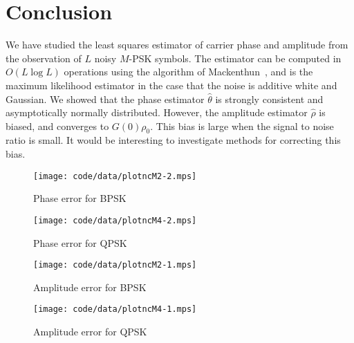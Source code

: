 \documentclass{article}
\begin{document}
\vspace{-0.1cm}
\section{Conclusion}
\vspace{-0.1cm}
We have studied the least squares estimator of carrier phase and amplitude from the observation of $L$ noisy $M$-PSK symbols.  The estimator can be computed in $O(L\log L)$ operations using the algorithm of Mackenthun~\cite{Mackenthun1994}, and is the maximum likelihood estimator in the case that the noise is additive white and Gaussian.  We showed that the phase estimator $\hat{\theta}$ is strongly consistent and asymptotically normally distributed.  However, the amplitude estimator $\hat{\rho}$ is biased, and converges to $G(0)\rho_0$.  This bias is large when the signal to noise ratio is small.  It would be interesting to investigate methods for correcting this bias. 


\begin{figure}[p]
	\centering
		\texttt{[image: code/data/plotncM2-2.mps]}
		\caption{Phase error for BPSK}
		\label{fig:plotphaseM2}
\end{figure}

\begin{figure}[p]
	\centering
		\texttt{[image: code/data/plotncM4-2.mps]}
		\caption{Phase error for QPSK}
		\label{fig:plotphaseM4}
\end{figure}

\begin{figure}[p]
	\centering
		\texttt{[image: code/data/plotncM2-1.mps]}
		\caption{Amplitude error for BPSK}
		\label{fig:plotampM2}
\end{figure}

\begin{figure}[p]
	\centering
		\texttt{[image: code/data/plotncM4-1.mps]}
		\caption{Amplitude error for QPSK}
		\label{fig:plotampM4}
\end{figure}

\nocite{McKilliamLinearTimeBlockPSK2009,Ryan2007}

\vfill\pagebreak




\end{document}
